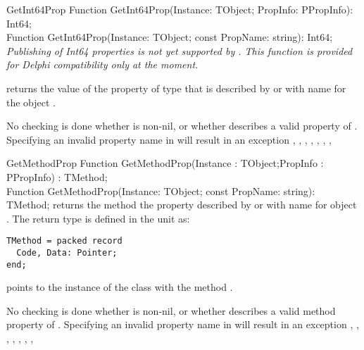 
\begin{function}{GetInt64Prop}
\Declaration
Function GetInt64Prop(Instance: TObject; PropInfo: PPropInfo): Int64;\\
Function GetInt64Prop(Instance: TObject; const PropName: string): Int64;
\Description
{\em Publishing of Int64 properties is not yet supported by \fpc. This
function is provided for Delphi compatibility only at the moment.}

 returns the value of the property of type
 that is described by  or with name  
for the object .

\Errors
No checking is done whether  is non-nil, or whether
 describes a valid  property of .
Specifying an invalid property name in  will result in an
 exception
\SeeAlso
{}, , ,
, , ,
, 
\end{function}


\begin{function}{GetMethodProp}
\Declaration
Function GetMethodProp(Instance : TObject;PropInfo : PPropInfo) : TMethod;\\
Function GetMethodProp(Instance: TObject; const PropName: string): TMethod;
\Description
{} returns the method the property described by
 or with name  for object .
The return type  is defined in the  unit as:
\begin{verbatim}
TMethod = packed record
  Code, Data: Pointer;
end;                                                                         
\end{verbatim}
 points to the instance of the class with the method .

\Errors
No checking is done whether  is non-nil, or whether
 describes a valid method property of .
Specifying an invalid property name in  will result in an
 exception
\SeeAlso
{}, , ,
, , ,
, 
\end{function}

